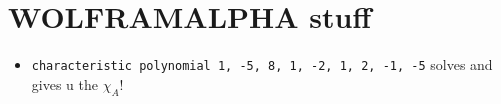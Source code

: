 \documentclass[]{scrartcl}
\newcommand{\<}{\trianglelefteq}
\begin{document}
\section*{WOLFRAMALPHA stuff}
\begin{itemize}
	\item \texttt{characteristic polynomial {{1, -5, 8}, {1, -2, 1}, {2, -1, -5}}} solves and gives u the $\chi_A$!
\end{itemize}
\end{document}
